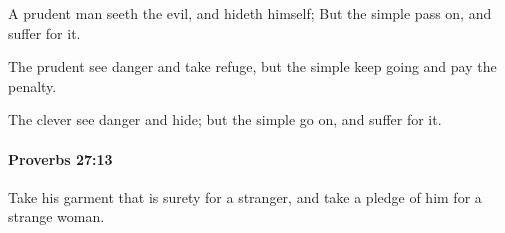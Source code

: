 			\begin{versebox}
					\item[BHS] 
					\item[ASV] A prudent man seeth the evil, and hideth himself; But the simple pass on, and suffer for it.
					\item[NIV] The prudent see danger and take refuge, but the simple keep going and pay the penalty.
					\item[NRSV] The clever see danger and hide; but the simple go on, and suffer for it.
			\end{versebox}

		\paragraph{Proverbs 27:13} %
			\label{PROVERBS-27-13}

			Take his garment that is surety for a stranger, and take a pledge of him for a strange woman.

